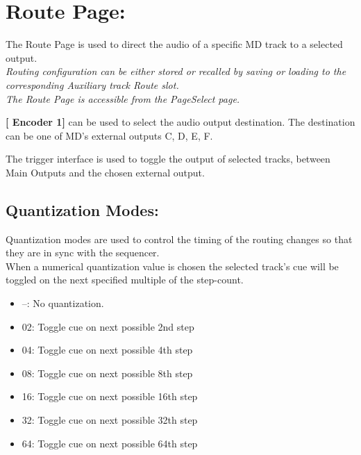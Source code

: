  \chapter{Route Page:}
 The Route Page is used to direct the audio of a specific MD track to a selected output.\\\textit{Routing configuration can be either stored or recalled by saving or loading to the corresponding Auxiliary track Route slot.} \\
 
\textit{The Route Page is accessible from the PageSelect page.}



\textbf{[ Encoder 1]} can be used to select the audio output destination. The destination can be one of MD's external outputs C, D, E, F.

The trigger interface is used to toggle the output of selected tracks, between Main Outputs and the chosen external output.

\newpage
\section{Quantization Modes:}
 Quantization modes are used to control the timing of the routing changes so that they are in sync with the sequencer.
 \\
 When a numerical quantization value is chosen the selected track’s cue will be toggled on the next specified multiple of the step-count.
 \begin{itemize}
\item --: No quantization.
\item 02: Toggle cue on next possible 2nd step
\item 04: Toggle cue on next possible 4th step
\item 08: Toggle cue on next possible 8th step 
\item 16: Toggle cue on next possible 16th step 
\item 32: Toggle cue on next possible 32th step 
\item 64: Toggle cue on next possible 64th step
 \end{itemize}
 
 